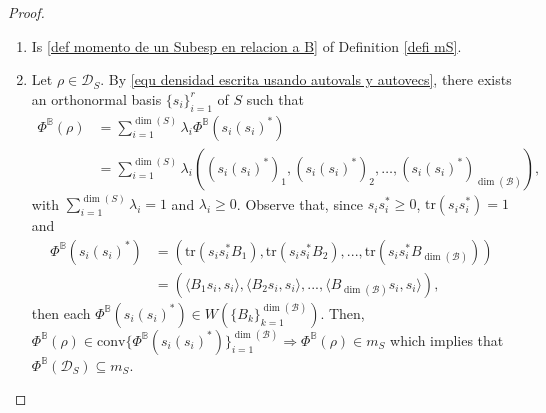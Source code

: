\documentclass[10pt,a4paper]{amsart}
\def\calB{\mathcal B}
\def\calD{\mathcal D}
\def\tr{\text{tr}}
\begin{document}
\begin{proof}
\begin{enumerate}

	\item[\ref{item3Prop1}.] Is \eqref{def momento de un Subesp en relacion a B} of Definition \ref{defi mS}.
	
	\item[\ref{mS = diag DsubS} $\Leftrightarrow$ \ref{item3Prop1}.] Let $\rho\in\calD_{S}$. By \eqref{equ densidad escrita usando autovals y autovecs}, there exists an orthonormal basis $\{s_i\}_{i=1}^r$ of $S$ such that
	\begin{equation} \label{eq phi de v}
		\begin{split}
		\Phi^{\mathbb{B}}(\rho)&=\sum_{i=1}^{\dim(S)} \lambda_i \Phi^{\mathbb{B}}(s_i (s_i)^*)\\
		&=\sum_{i=1}^{\dim(S)} \lambda_i \left( (s_i (s_i)^*)_1, (s_i (s_i)^*)_2, \dots, (s_{i} (s_{i})^*)_{\dim(\calB)}\right), 
	\end{split}
	\end{equation}
	with $\sum_{i=1}^{\dim(S)}\lambda_i=1$ and $\lambda_i\geq 0$. Observe that, since $s_i s_i^*\geq 0$, $\tr(s_i s_i^*)=1$ and
	\begin{equation*}
		\begin{split}
	\Phi^{\mathbb{B}}(s_i (s_i)^*)&=\left(\tr(s_is_i^*B_1), \tr(s_is_i^*B_2),..., \tr(s_is_i^*B_{\dim(\mathcal{B})}) \right)\\
	&=\left(\langle B_1s_i,s_i\rangle,\langle B_2s_i,s_i\rangle,...,\langle B_{\dim(\mathcal{B})}s_i,s_i\rangle \right),		
		\end{split}
	\end{equation*}
	then each $\Phi^{\mathbb{B}}(s_i (s_i)^*)\in W\left(\{B_k\}_{k=1}^{\dim(\mathcal{B})} \right)$.
	Then, $\Phi^{\mathbb{B}}(\rho)\in\text{conv}\{\Phi^{\mathbb{B}}(s_i (s_i)^*)\}_{i=1}^{\dim(\mathcal{B})}\Rightarrow \Phi^{\mathbb{B}}(\rho)\in m_S$ which implies that $\Phi^{\mathbb{B}}(\calD_{S})\subseteq m_S$.
		

\end{enumerate}
\end{proof}
\end{document}
